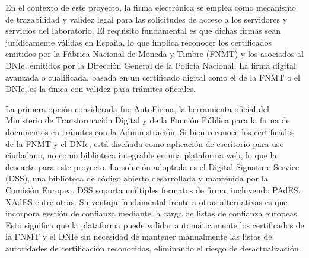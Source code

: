 En el contexto de este proyecto, la firma electrónica se emplea como mecanismo
de trazabilidad y validez legal para las solicitudes de acceso a los servidores
y servicios del laboratorio. El requisito fundamental es que dichas firmas sean
jurídicamente válidas en España, lo que implica reconocer los certificados
emitidos por la Fábrica Nacional de Moneda y Timbre (FNMT) y los
asociados al DNIe, emitidos por la Dirección General de la Policía Nacional.
La firma digital avanzada o cualificada, basada en un
certificado digital como el de la FNMT o el DNIe, es la única con validez
para trámites oficiales. 

La primera opción considerada fue AutoFirma, la herramienta
oficial del Ministerio de Transformación Digital y de la Función Pública para la firma de documentos en trámites
con la Administración. Si bien reconoce los certificados de la FNMT y el DNIe,
está diseñada como aplicación de escritorio para uso ciudadano, no como
biblioteca integrable en una plataforma web, lo que la descarta para este proyecto. La solución adoptada es el Digital Signature Service (DSS), una
biblioteca de código abierto desarrollada y mantenida por la Comisión Europea.
DSS soporta múltiples formatos de firma, incluyendo PAdES,
XAdES entre otras. Su ventaja fundamental frente a otras alternativas es que
incorpora gestión de confianza mediante la carga de listas
de confianza europeas.  Esto significa que la plataforma puede validar
automáticamente los certificados de la FNMT y el DNIe sin necesidad de
mantener manualmente las listas de autoridades de certificación reconocidas,
eliminando el riesgo de desactualización. \cite{eu_digital_signature_service}







